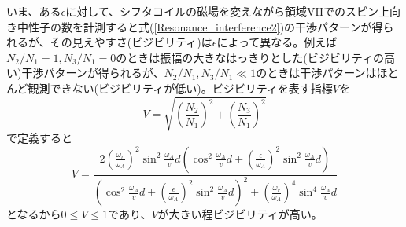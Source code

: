 いま、ある$\epsilon$に対して、シフタコイルの磁場を変えながら領域VIIでのスピン上向き中性子の数を計測すると式(\ref{Resonance_interference2})の干渉パターンが得られるが、その見えやすさ(ビジビリティ)は$\epsilon$によって異なる。例えば$N_2/N_1=1,N_3/N_1=0$のときは振幅の大きなはっきりとした(ビジビリティの高い)干渉パターンが得られるが、$N_2/N_1,N_3/N_1 \ll 1$のときは干渉パターンはほとんど観測できない(ビジビリティが低い)。ビジビリティを表す指標$V$を
\begin{equation}
V=\sqrt{\left(\frac{N_2}{N_1}\right)^2+\left(\frac{N_3}{N_1}\right)^2}
\end{equation}
で定義すると
\begin{equation}
V=\frac{2\left(\frac{\omega_r}{\omega_A}\right)^2\sin^2\frac{\omega_A}{v}d \left(\cos^2 \frac{\omega_A}{v}d+\left(\frac{\epsilon}{\omega_A}\right)^2\sin^2\frac{\omega_A}{v}d\right)}{\left(\cos^2 \frac{\omega_A}{v}d+\left(\frac{\epsilon}{\omega_A}\right)^2\sin^2\frac{\omega_A}{v}d\right)^2+\left(\frac{\omega_r}{\omega_A}\right)^4\sin^4\frac{\omega_A}{v}d}
\end{equation}
となるから$0 \le V \le 1$であり、$V$が大きい程ビジビリティが高い。

